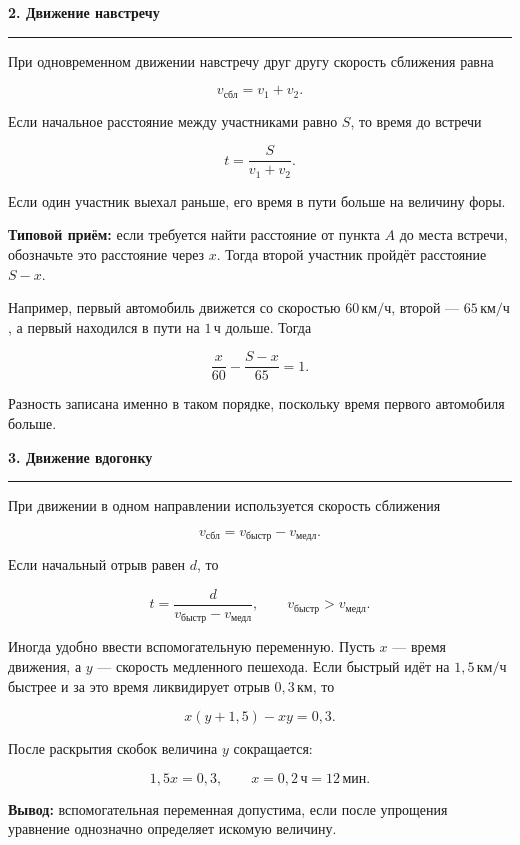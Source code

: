 \documentclass[a4paper,12pt]{article}
\newcommand{\sect}[1]{%
    \vspace{0.35em}%
    {\Large\bfseries\color{darkaccent}#1}\par
    \vspace{0.22em}%
    \color{linegray}\hrule
    \color{textgray}%
    \vspace{0.55em}%
}
\newcommand{\important}[1]{\textbf{\color{darkaccent}#1}}
\newcommand{\unit}[1]{\,\text{#1}}
\begin{document}
\clearpage


\sect{2. Движение навстречу}

При одновременном движении навстречу друг другу скорость сближения равна

\[
v_{\text{сбл}}=v_1+v_2.
\]

Если начальное расстояние между участниками равно $S$, то время до встречи

\[
t=\frac{S}{v_1+v_2}.
\]

Если один участник выехал раньше, его время в пути больше на величину форы.

\important{Типовой приём:}
если требуется найти расстояние от пункта $A$ до места встречи,
обозначьте это расстояние через $x$.
Тогда второй участник пройдёт расстояние $S-x$.

Например, первый автомобиль движется со скоростью $60\unit{км/ч}$,
второй --- $65\unit{км/ч}$, а первый находился в пути на $1\unit{ч}$ дольше.
Тогда

\[
\frac{x}{60}-\frac{S-x}{65}=1.
\]

Разность записана именно в таком порядке,
поскольку время первого автомобиля больше.


\sect{3. Движение вдогонку}

При движении в одном направлении используется скорость сближения

\[
v_{\text{сбл}}=v_{\text{быстр}}-v_{\text{медл}}.
\]

Если начальный отрыв равен $d$, то

\[
t=\frac{d}{v_{\text{быстр}}-v_{\text{медл}}},
\qquad
v_{\text{быстр}}>v_{\text{медл}}.
\]

Иногда удобно ввести вспомогательную переменную.
Пусть $x$ --- время движения, а $y$ --- скорость медленного пешехода.
Если быстрый идёт на $1{,}5\unit{км/ч}$ быстрее и за это время ликвидирует отрыв $0{,}3\unit{км}$, то

\[
x(y+1{,}5)-xy=0{,}3.
\]

После раскрытия скобок величина $y$ сокращается:

\[
1{,}5x=0{,}3,
\qquad
x=0{,}2\unit{ч}=12\unit{мин}.
\]

\important{Вывод:}
вспомогательная переменная допустима, если после упрощения уравнение
однозначно определяет искомую величину.
\end{document}
